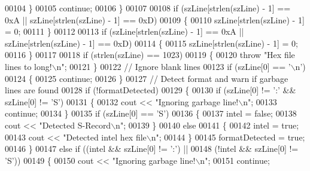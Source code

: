 \begin{DoxyCode}
00104                 \}
00105                 \textcolor{keywordflow}{continue};
00106             \}
00107 
00108             \textcolor{keywordflow}{if} (szLine[strlen(szLine) - 1] == 0xA || szLine[strlen(szLine) - 1] == 0xD)
00109             \{
00110                 szLine[strlen(szLine) - 1] = 0;
00111             \}
00112 
00113             \textcolor{keywordflow}{if} (szLine[strlen(szLine) - 1] == 0xA || szLine[strlen(szLine) - 1] == 0xD)
00114             \{
00115                 szLine[strlen(szLine) - 1] = 0;
00116             \}
00117 
00118             \textcolor{keywordflow}{if} (strlen(szLine) == 1023)
00119             \{
00120                 \textcolor{keywordflow}{throw} \textcolor{stringliteral}{"Hex file lines to long!\(\backslash\)n"};
00121             \}
00122             \textcolor{comment}{// Ignore blank lines}
00123             \textcolor{keywordflow}{if} (szLine[0] == \textcolor{charliteral}{'\(\backslash\)n'})
00124             \{
00125                 \textcolor{keywordflow}{continue};
00126             \}
00127             \textcolor{comment}{// Detect format and warn if garbage lines are found}
00128             \textcolor{keywordflow}{if} (!formatDetected)
00129             \{
00130                 \textcolor{keywordflow}{if} (szLine[0] != \textcolor{charliteral}{':'} && szLine[0] != \textcolor{charliteral}{'S'})
00131                 \{
00132                     cout << \textcolor{stringliteral}{"Ignoring garbage line!\(\backslash\)n"};
00133                     \textcolor{keywordflow}{continue};
00134                 \}
00135                 \textcolor{keywordflow}{if} (szLine[0] == \textcolor{charliteral}{'S'})
00136                 \{
00137                     intel = \textcolor{keyword}{false};
00138                     cout << \textcolor{stringliteral}{"Detected S-Record\(\backslash\)n"};
00139                 \}
00140                 \textcolor{keywordflow}{else}
00141                 \{
00142                     intel = \textcolor{keyword}{true};
00143                     cout << \textcolor{stringliteral}{"Detected intel hex file\(\backslash\)n"};
00144                 \}
00145                 formatDetected = \textcolor{keyword}{true};
00146             \}
00147             \textcolor{keywordflow}{else} \textcolor{keywordflow}{if} ((intel && szLine[0] != \textcolor{charliteral}{':'}) ||
00148                     (!intel && szLine[0] != \textcolor{charliteral}{'S'}))
00149             \{
00150                 cout << \textcolor{stringliteral}{"Ignoring garbage line!\(\backslash\)n"};
00151                 \textcolor{keywordflow}{continue};

\end{DoxyCode}
